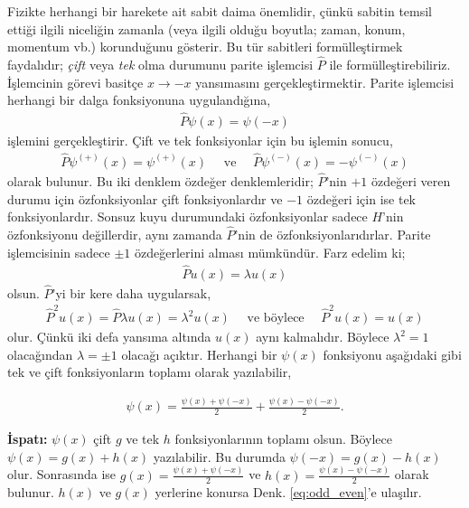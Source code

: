 \documentclass[a4paper,12pt, twoside]{article}
\begin{document}
Fizikte herhangi bir harekete ait sabit daima önemlidir, çünkü sabitin temsil ettiği ilgili niceliğin zamanla (veya ilgili olduğu boyutla; zaman, konum, momentum vb.) korunduğunu gösterir. Bu tür sabitleri formülleştirmek faydalıdır; \emph{çift} veya \emph{tek} olma durumunu parite işlemcisi $\hat P$ ile formülleştirebiliriz. İşlemcinin görevi basitçe $x\rightarrow -x$ yansımasını gerçekleştirmektir. Parite işlemcisi herhangi bir dalga fonksiyonuna uygulandığına,
\begin{align}
\hat P \psi(x)=\psi(-x)
\end{align}
işlemini gerçekleştirir. Çift ve tek fonksiyonlar için bu işlemin sonucu,
\begin{align}
\hat P \psi^{(+)}(x)=\psi^{(+)}(x)
\quad \text{ ve } \quad \hat P \psi^{(-)}(x)=-\psi^{(-)}(x)
\end{align}
olarak bulunur. Bu iki denklem özdeğer denklemleridir; $\hat P$'nin $+1$ özdeğeri veren durumu için özfonksiyonlar çift fonksiyonlardır ve $-1$ özdeğeri için ise tek fonksiyonlardır. Sonsuz kuyu durumundaki özfonksiyonlar sadece $H$'nin özfonksiyonu değillerdir, aynı zamanda $\hat P$'nin de özfonksiyonlarıdırlar. Parite işlemcisinin sadece $\pm 1$ özdeğerlerini alması mümkündür. Farz edelim ki;
\begin{align}
\hat P u(x)=\lambda u(x)
\end{align}
olsun. $\hat P$'yi bir kere daha uygularsak,
\begin{align}
\hat P^2 u(x)=\hat P \lambda u(x)
= \lambda^2 u(x) \quad \text{ ve böylece }  \quad  \hat P^2 u(x)= u(x) 
\end{align}
olur. Çünkü  iki defa yansıma altında $u(x)$ aynı kalmalıdır. Böylece $\lambda^2 = 1$ olacağından $\lambda = \pm 1$ olacağı açıktır. Herhangi bir $\psi(x)$ fonksiyonu aşağıdaki gibi tek ve çift fonksiyonların toplamı olarak yazılabilir,

\begin{align}
\label{eq:odd_even}
\psi(x) = \frac {\psi(x) + \psi(-x)}2  + \frac {\psi(x) - \psi(-x)}2.
\end{align}

{\bf İspatı:} $\psi(x)$ çift  $g$ ve tek $h$ fonksiyonlarının toplamı olsun. Böylece $\psi(x) = g(x) + h(x)$ yazılabilir. Bu durumda $\psi(-x) = g(x) - h(x)$ olur. Sonrasında ise $g(x) = \frac {\psi(x) + \psi(-x)}2$ ve $h(x) = \frac {\psi(x) - \psi(-x)}2$ olarak bulunur. $h(x)$ ve $g(x)$ yerlerine konursa Denk. \ref{eq:odd_even}'e ulaşılır.
\end{document}
